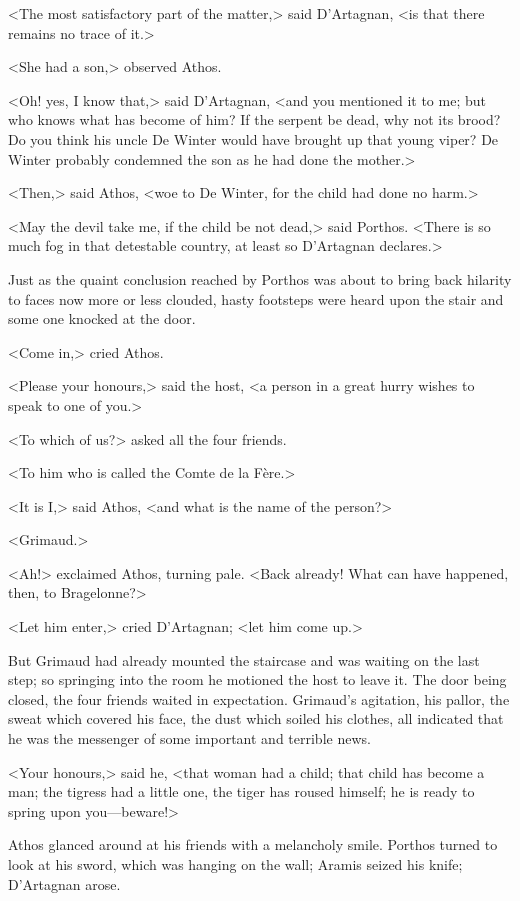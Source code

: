 <The most satisfactory part of the matter,> said D'Artagnan, <is that there remains no trace of it.>

<She had a son,> observed Athos.

<Oh! yes, I know that,> said D'Artagnan, <and you mentioned it to me; but who knows what has become of him? If the serpent be dead, why not its brood? Do you think his uncle De Winter would have brought up that young viper? De Winter probably condemned the son as he had done the mother.>

<Then,> said Athos, <woe to De Winter, for the child had done no harm.>

<May the devil take me, if the child be not dead,> said Porthos. <There is so much fog in that detestable country, at least so D'Artagnan declares.>

Just as the quaint conclusion reached by Porthos was about to bring back hilarity to faces now more or less clouded, hasty footsteps were heard upon the stair and some one knocked at the door.

<Come in,> cried Athos.

<Please your honours,> said the host, <a person in a great hurry wishes to speak to one of you.>

<To which of us?> asked all the four friends.

<To him who is called the Comte de la Fère.>

<It is I,> said Athos, <and what is the name of the person?>

<Grimaud.>

<Ah!> exclaimed Athos, turning pale. <Back already! What can have happened, then, to Bragelonne?>

<Let him enter,> cried D'Artagnan; <let him come up.>

But Grimaud had already mounted the staircase and was waiting on the last step; so springing into the room he motioned the host to leave it. The door being closed, the four friends waited in expectation. Grimaud's agitation, his pallor, the sweat which covered his face, the dust which soiled his clothes, all indicated that he was the messenger of some important and terrible news.

<Your honours,> said he, <that woman had a child; that child has become a man; the tigress had a little one, the tiger has roused himself; he is ready to spring upon you—beware!>

Athos glanced around at his friends with a melancholy smile. Porthos turned to look at his sword, which was hanging on the wall; Aramis seized his knife; D'Artagnan arose.

